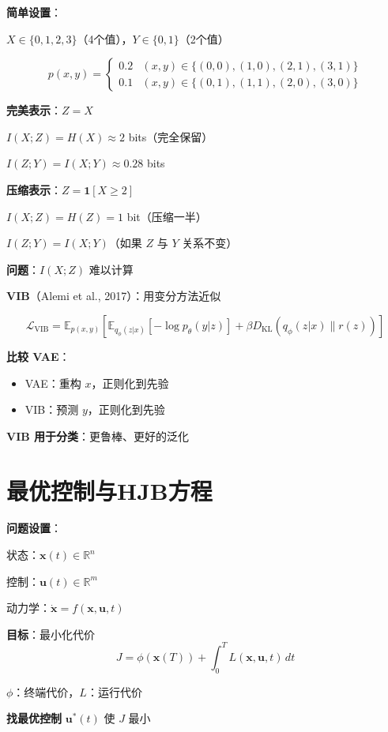 \documentclass[12pt, a4paper]{ctexart}
\begin{document}
\begin{blackboard}[信息瓶颈的数值例子]

\textbf{简单设置}：

$X \in \{0, 1, 2, 3\}$（4个值），$Y \in \{0, 1\}$（2个值）

\[
p(x, y) = \begin{cases}
0.2 & (x, y) \in \{(0,0), (1,0), (2,1), (3,1)\} \\
0.1 & (x, y) \in \{(0,1), (1,1), (2,0), (3,0)\}
\end{cases}
\]

\textbf{完美表示}：$Z = X$

$I(X; Z) = H(X) \approx 2$ bits（完全保留）

$I(Z; Y) = I(X; Y) \approx 0.28$ bits

\textbf{压缩表示}：$Z = \mathbf{1}[X \geq 2]$

$I(X; Z) = H(Z) = 1$ bit（压缩一半）

$I(Z; Y) = I(X; Y)$（如果 $Z$ 与 $Y$ 关系不变）

\end{blackboard}

\begin{blackboard}

\textbf{问题}：$I(X; Z)$ 难以计算

\textbf{VIB}（Alemi et al., 2017）：用变分方法近似

\[
\mathcal{L}_{\text{VIB}} = \mathbb{E}_{p(x,y)}\left[ \mathbb{E}_{q_\phi(z|x)}[-\log p_\theta(y|z)] + \beta D_{\text{KL}}(q_\phi(z|x) \| r(z)) \right]
\]

\textbf{比较 VAE}：
\begin{itemize}
    \item VAE：重构 $x$，正则化到先验
    \item VIB：预测 $y$，正则化到先验
\end{itemize}

\textbf{VIB 用于分类}：更鲁棒、更好的泛化

\end{blackboard}

\section{最优控制与HJB方程}\label{sec:hjb}

\begin{blackboard}[最优控制问题]

\textbf{问题设置}：

状态：$\mathbf{x}(t) \in \mathbb{R}^n$

控制：$\mathbf{u}(t) \in \mathbb{R}^m$

动力学：$\dot{\mathbf{x}} = f(\mathbf{x}, \mathbf{u}, t)$

\textbf{目标}：最小化代价
\[
J = \phi(\mathbf{x}(T)) + \int_0^T L(\mathbf{x}, \mathbf{u}, t) \, dt
\]

$\phi$：终端代价，$L$：运行代价

\textbf{找最优控制} $\mathbf{u}^*(t)$ 使 $J$ 最小

\end{blackboard}
\end{document}
